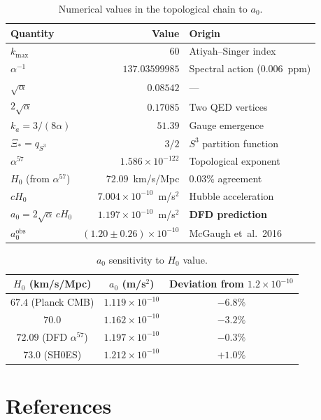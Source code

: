 \documentclass[12pt,a4paper]{article}
\newcommand{\Hzero}{H_0}
\newcommand{\ee}[1]{\times 10^{#1}}
\begin{document}
\begin{table}[h]
\centering
\caption{Numerical values in the topological chain to $a_0$.}
\renewcommand{\arraystretch}{1.3}
\begin{tabular}{lrl}
\toprule
\textbf{Quantity} & \textbf{Value} & \textbf{Origin} \\
\midrule
$k_{\max}$ & 60 & Atiyah--Singer index \\
$\alpha^{-1}$ & $137.03599985$ & Spectral action (0.006~ppm) \\
$\sqrt{\alpha}$ & $0.08542$ & --- \\
$2\sqrt{\alpha}$ & $0.17085$ & Two QED vertices \\
$k_a = 3/(8\alpha)$ & $51.39$ & Gauge emergence \\
$\Xi_* = q_{S^3}$ & $3/2$ & $S^3$ partition function \\
$\alpha^{57}$ & $1.586 \ee{-122}$ & Topological exponent \\
$\Hzero$ (from $\alpha^{57}$) & $72.09$~km/s/Mpc & 0.03\% agreement \\
$c\Hzero$ & $7.004 \ee{-10}$~m/s$^2$ & Hubble acceleration \\
$a_0 = 2\sqrt{\alpha}\,c\Hzero$ & $1.197 \ee{-10}$~m/s$^2$ & \textbf{DFD prediction} \\
$a_0^{\mathrm{obs}}$ & $(1.20 \pm 0.26) \ee{-10}$ & McGaugh et~al.\ 2016 \\
\bottomrule
\end{tabular}
\end{table}

\begin{table}[h]
\centering
\caption{$a_0$ sensitivity to $\Hzero$ value.}
\renewcommand{\arraystretch}{1.3}
\begin{tabular}{ccc}
\toprule
$\Hzero$ (km/s/Mpc) & $a_0$ (m/s$^2$) & Deviation from $1.2 \ee{-10}$ \\
\midrule
$67.4$ (Planck CMB) & $1.119 \ee{-10}$ & $-6.8\%$ \\
$70.0$ & $1.162 \ee{-10}$ & $-3.2\%$ \\
$72.09$ (DFD $\alpha^{57}$) & $1.197 \ee{-10}$ & $-0.3\%$ \\
$73.0$ (SH0ES) & $1.212 \ee{-10}$ & $+1.0\%$ \\
\bottomrule
\end{tabular}
\end{table}


\section*{References}
\end{document}

